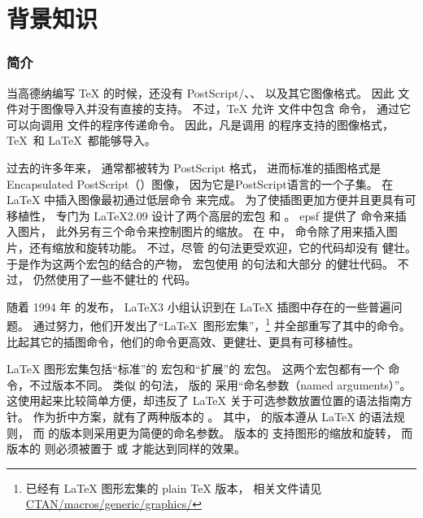 \part{背景知识}

\section{简介}\label{sec:introduction}
当高德纳编写 \TeX{} 的时候，还没有 PostScript/、、 以及其它图像格式。
因此  文件对于图像导入并没有直接的支持。
不过，\TeX{} 允许 文件中包含  命令，
通过它可以向调用  文件的程序传递命令。
因此，凡是调用  的程序支持的图像格式，
\TeX\ 和 \LaTeX\ 都能够导入。

过去的许多年来， 通常都被转为 PostScript 格式，
进而标准的插图格式是 Encapsulated PostScript（）图像，
因为它是PostScript语言的一个子集。
在 \LaTeX{} 中插入图像最初通过低层命令  来完成。
为了使插图更加方便并且更具有可移植性，
专门为 \LaTeX 2.09 设计了两个高层的宏包  和 。
\textsf{epsf} 提供了  命令来插入图片，
此外另有三个命令来控制图片的缩放。
在  中， 命令除了用来插入图片，还有缩放和旋转功能。
不过，尽管  的句法更受欢迎，它的代码却没有  健壮。
于是作为这两个宏包的结合的产物，
 宏包使用  的句法和大部分  的健壮代码。
不过， 仍然使用了一些不健壮的  代码。

随着 1994 年 \LaTeXe{} 的发布，
\LaTeX 3 小组认识到在 \LaTeX{} 插图中存在的一些普遍问题。
通过努力，他们开发出了“\LaTeX\ 图形宏集”，\footnote{
    已经有 \LaTeX{} 图形宏集的 plain \TeX{} 版本，
	相关文件请见 \href{ftp://ctan.tug.org/tex-archive/macros/plain/graphics/}{CTAN/macros/generic/graphics/}}
并全部重写了其中的命令。
比起其它的插图命令，他们的命令更高效、更健壮、更具有可移植性。

\LaTeX{} 图形宏集包括“标准”的  宏包和“扩展”的  宏包。
这两个宏包都有一个  命令，不过版本不同。
类似  的句法，
 版的  采用“命名参数（named arguments）”。
这使用起来比较简单方便，却违反了 \LaTeX{} 关于可选参数放置位置的语法指南方针。
作为折中方案，就有了两种版本的 。
其中， 的版本遵从 \LaTeX{} 的语法规则，
而 的版本则采用更为简便的命名参数。
 版本的  支持图形的缩放和旋转，
而  版本的  则必须被置于  或  才能达到同样的效果。

